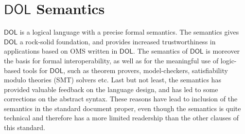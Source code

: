 \documentclass[10pt,fleqn,final]{scrreprt}
\newcommand*{\CL}{\ensuremath{\mathsf{CL}}\xspace}
\newcommand*{\DOL}{\ensuremath{\mathsf{DOL}}\xspace}
\newcommand{\clause}[1]{\chapter{#1}}
\newenvironment{definitions}[0]{\medskip }{}
\begin{document}
\begin{definitions}
\clause{\DOL Semantics}\label{c:semantics}

%
%


\DOL is a logical language with a precise formal semantics.  The
semantics gives \DOL a rock-solid foundation, and provides increased
trustworthiness in applications based on OMS written in \DOL.  The
semantics of \DOL is moreover the basis for formal interoperability, as
well as for the meaningful use of logic-based tools for \DOL, such as
theorem provers, model-checkers, satisfiability modulo theories (SMT) solvers etc.  Last but not least,
the semantics has provided valuable feedback on the language design,
and has led to some corrections on the abstract syntax.  These
reasons have lead to inclusion of the semantics in the standard
document proper, even though the semantics is quite technical and
therefore has a more limited readership than the other clauses of
this standard.


\end{definitions}
\end{document}
